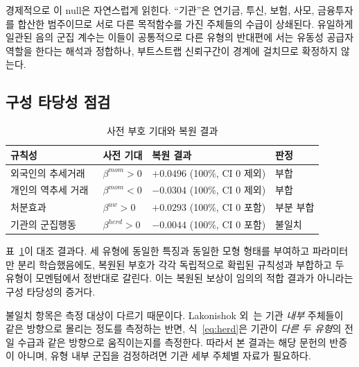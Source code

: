 경제적으로 이 null은 자연스럽게 읽힌다. ``기관''은 연기금, 투신, 보험, 사모,
금융투자를 합산한 범주이므로 서로 다른 목적함수를 가진 주체들의 수급이 상쇄된다.
유일하게 일관된 음의 군집 계수는 이들이 공통적으로 다른 유형의 반대편에 서는
유동성 공급자 역할을 한다는 해석과 정합하나, 부트스트랩 신뢰구간이 경계에
걸치므로 확정하지 않는다.

\subsection{구성 타당성 점검}
\label{sec:construct}

\begin{table}[t]
  \caption{사전 부호 기대와 복원 결과}
  \label{tab:construct}
  \small
  \begin{tabular}{@{}>{\raggedright\arraybackslash}p{}
                  >{\raggedright\arraybackslash}p{}
                  >{\raggedright\arraybackslash}p{}
                  >{\raggedright\arraybackslash}p{}@{}}
    \toprule
    규칙성 & 사전 기대 & 복원 결과 & 판정 \\
    \midrule
    외국인의 추세거래~\cite{grinblatt2000investment,choe1999foreign}
      & $\beta^{mom}>0$ & $+0.0496$ (100\%, CI 0 제외) & 부합 \\
    개인의 역추세 거래~\cite{grinblatt2000investment,kaniel2008individual}
      & $\beta^{mom}<0$ & $-0.0304$ (100\%, CI 0 제외) & 부합 \\
    처분효과~\cite{shefrin1985disposition,odean1998investors}
      & $\beta^{uw}>0$ & $+0.0293$ (100\%, CI 0 포함) & 부분 부합 \\
    기관의 군집행동~\cite{lakonishok1992impact}
      & $\beta^{herd}>0$ & $-0.0044$ (100\%, CI 0 포함) & 불일치 \\
    \bottomrule
  \end{tabular}
\end{table}

표~\ref{tab:construct}이 대조 결과다. 세 유형에 동일한 특징과 동일한 모형 형태를
부여하고 파라미터만 분리 학습했음에도, 복원된 부호가 각각 독립적으로 확립된
규칙성과 부합하고 두 유형이 모멘텀에서 정반대로 갈린다. 이는 복원된 보상이 임의의
적합 결과가 아니라는 구성 타당성의 증거다.

불일치 항목은 측정 대상이 다르기 때문이다. Lakonishok
외~\cite{lakonishok1992impact}는 기관 \emph{내부} 주체들이 같은 방향으로 몰리는
정도를 측정하는 반면, 식~\eqref{eq:herd}은 기관이 \emph{다른 두 유형}의 전일
수급과 같은 방향으로 움직이는지를 측정한다. 따라서 본 결과는 해당 문헌의 반증이
아니며, 유형 내부 군집을 검정하려면 기관 세부 주체별 자료가 필요하다.

